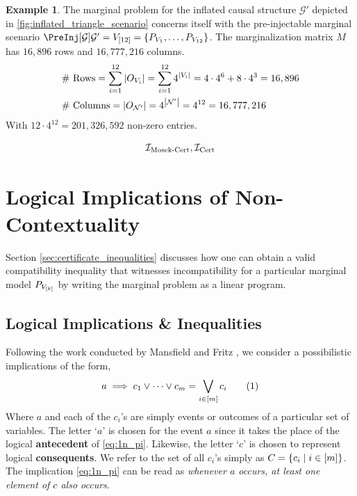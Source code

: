 \documentclass[aps, 10pt, english, twoside, pra, nofootinbib, longbibliography]{revtex4-1}
\theoremstyle{plain}
\theoremstyle{definition}
\newtheorem{example}[theorem]{Example}
\theoremstyle{remark}
\newcommand{\graph}{\mathcal{G}}
\newcommand{\nodes}{\mathcal{N}}
\newcommand{\term}[1]{\textcolor{Mahogany}{\textbf{#1}}}
\begin{document}
    \begin{example}
        The marginal problem for the inflated causal structure $\graph'$ depicted in \cref{fig:inflated_triangle_scenario} concerns itself with the pre-injectable marginal scenario $\PreInj[\graph]{\graph'} = V_{\bs{12}} = \bc{\prob[V_1], \ldots, \prob[V_{12}]}$. The marginalization matrix $M$ has $16,896$ rows and $16,777,216$ columns.
        \begin{align*}
            &\text{\# Rows} = \sum_{i=1}^{12} \abs{O_{V_i}} = \sum_{i=1}^{12} 4^{\abs{V_i}} = 4 \cdot 4^6 + 8 \cdot 4^3 = 16,896 \\
            &\text{\# Columns} = \abs{O_{\nodes'}} = 4^{\abs{\nodes'}} = 4^{12} = 16,777,216
        \end{align*}
        With $12 \cdot 4^{12} = 201,326,592$ non-zero entries.
    \end{example}


    \[ \mathcal{I}_\text{Mosek-Cert}, \mathcal{I}_\text{Cert} \]

    \section{Logical Implications of Non-Contextuality}

    Section \ref{sec:certificate_inequalities} discusses how one can obtain a valid compatibility inequality that witnesses incompatibility for a particular marginal model $\prob_{V_{\bs{k}}}$ by writing the marginal problem as a linear program.
    \subsection{Logical Implications \& Inequalities}
    \label{sec:implication_inequalities}
    Following the work conducted by Mansfield and Fritz \cite{Mansfield_2012}, we consider a possibilistic implications of the form,
    \[ a \implies c_1 \lor \cdots \lor c_m = \bigvee_{i\in \bs{m}} c_i \eq \label{eq:1n_pi}\]
    Where $a$ and each of the $c_i$'s are simply events or outcomes of a particular set of variables. The letter `$a$' is chosen for the event $a$ since it takes the place of the logical \term{antecedent} of \cref{eq:1n_pi}. Likewise, the letter `$c$' is chosen to represent logical \term{consequents}. We refer to the set of all $c_i$'s simply as $C = \left\{ c_i \mid i \in \left[ m \right] \right\}$. The implication \cref{eq:1n_pi} can be read as \textit{whenever $a$ occurs, at least one element of $c$ also occurs}.
\end{document}
